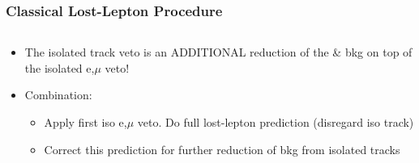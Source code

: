 \documentclass{beamer}
\begin{document}
\begin{frame}
\frametitle{Classical Lost-Lepton Procedure}
 \begin{columns}  
 \begin{column}{0.50\textwidth}
\begin{itemize}
 \item The isolated track veto is an ADDITIONAL reduction of the \ttbar \& \wpj bkg on top of the isolated e,$\mu$ veto!
 \item Combination:
 \begin{itemize}
  \item Apply first iso e,$\mu$ veto. Do full lost-lepton prediction (disregard iso track)
  \item Correct this prediction for further reduction of bkg from isolated tracks
 \end{itemize}

\end{itemize}


\end{column}
\end{columns}
\end{frame}
\end{document}
